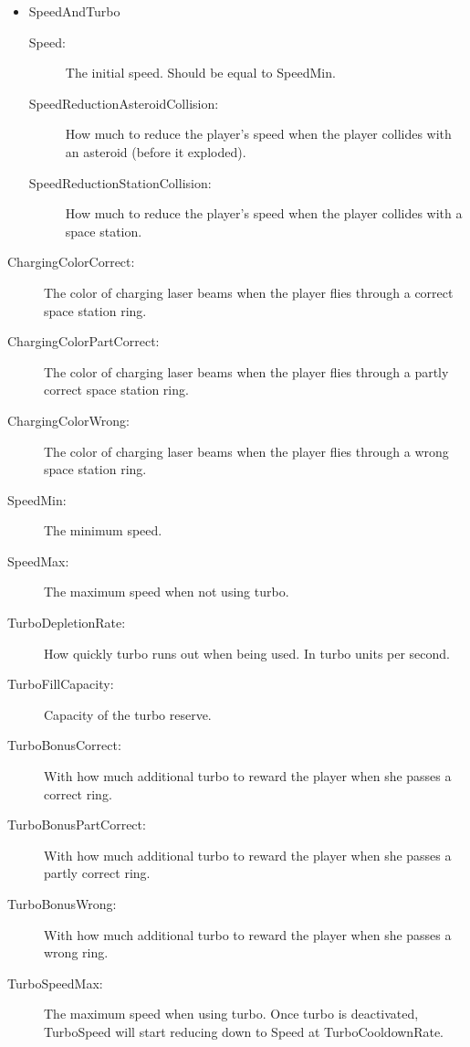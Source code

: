 \documentclass[11pt,a4paper]{article}
\begin{document}
\begin{itemize}
\begin{itemize}
\begin{description}
                    \end{description}
                    \item SpeedAndTurbo
                    \begin{description}
                    	\item[Speed:] The initial speed. Should be equal to SpeedMin.
                        \item[SpeedReductionAsteroidCollision:] How much to reduce the player's speed when the player collides with an asteroid (before it exploded).
                        \item[SpeedReductionStationCollision:] How much to reduce the player's speed when the player collides with a space station.
                    \end{description}
                 \end{itemize}
                 \begin{description}
                 	\item[ChargingColorCorrect:] The color of charging laser beams when the player flies through a correct space station ring.
                    \item[ChargingColorPartCorrect:] The color of charging laser beams when the player flies through a partly correct space station ring.
                    \item[ChargingColorWrong:] The color of charging laser beams when the player flies through a wrong space station ring.
                    \item[SpeedMin:] The minimum speed.
                    \item[SpeedMax:] The maximum speed when not using turbo.
                    \item[TurboDepletionRate:] How quickly turbo runs out when being used. In turbo units per second.
                    \item[TurboFillCapacity:] Capacity of the turbo reserve.
                    \item[TurboBonusCorrect:] With how much additional turbo to reward the player when she passes a correct ring.
                    \item[TurboBonusPartCorrect:] With how much additional turbo to reward the player when she passes a partly correct ring.
                    \item[TurboBonusWrong:] With how much additional turbo to reward the player when she passes a wrong ring.
                    \item[TurboSpeedMax:] The maximum speed when using turbo. Once turbo is deactivated, TurboSpeed will start reducing down to Speed at TurboCooldownRate.

\end{description}
\end{itemize}
\end{document}
